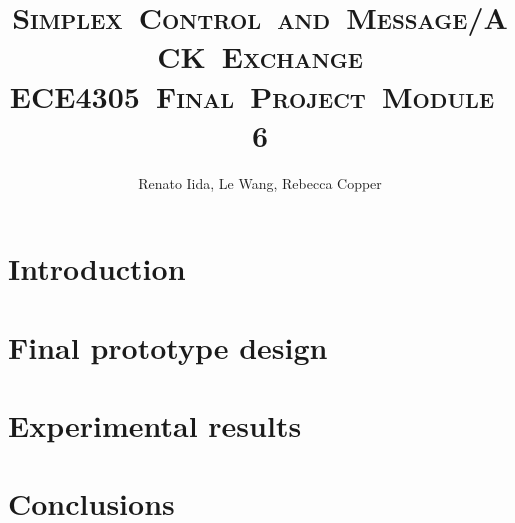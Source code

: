 \documentclass[11pt]{mvlthesis}
\title{\scshape \mbox{Simplex Control and Message/ACK Exchange}\\
\scshape \mbox{ECE4305 Final Project Module 6}}
\author{Renato Iida, Le Wang, Rebecca Copper}
\begin{document}
\maketitle
\begin{abstract}



\end{abstract}


\begin{frontmatter}

\begin{acknowledgements}
\end{acknowledgements}
\tableofcontents
\listoffigures
\listoftables

\end{frontmatter}



\chapter{Introduction}
\label{ch:introduction}



\chapter{Final prototype design}
\label{ch:design}


\chapter{Experimental results}
\label{ch:results}



\chapter{Conclusions}
\label{ch:conclusions}




\end{document}
